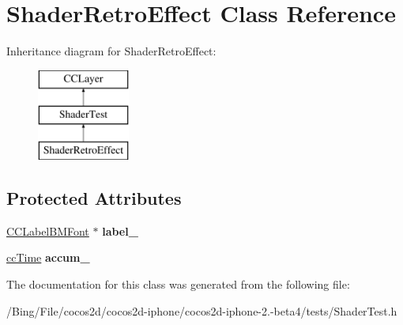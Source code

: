 \hypertarget{interface_shader_retro_effect}{\section{Shader\-Retro\-Effect Class Reference}
\label{interface_shader_retro_effect}
}
Inheritance diagram for Shader\-Retro\-Effect\-:\begin{figure}[H]
\begin{center}
\leavevmode
\includegraphics[height=3.000000cm]{interface_shader_retro_effect}
\end{center}
\end{figure}
\subsection*{Protected Attributes}
\begin{DoxyCompactItemize}
\item 
\hypertarget{interface_shader_retro_effect_ab63a853cc90b80a02f6abe6f64b9cf45}{\hyperlink{interface_c_c_label_b_m_font}{C\-C\-Label\-B\-M\-Font} $\ast$ {\bfseries label\-\_\-}}\label{interface_shader_retro_effect_ab63a853cc90b80a02f6abe6f64b9cf45}

\item 
\hypertarget{interface_shader_retro_effect_a6e23c67c688bb849b01536183e5b4ac7}{\hyperlink{cc_types_8h_ae6c674aac4bfb46a4e6cb1e89bb66b4f}{cc\-Time} {\bfseries accum\-\_\-}}\label{interface_shader_retro_effect_a6e23c67c688bb849b01536183e5b4ac7}

\end{DoxyCompactItemize}


The documentation for this class was generated from the following file\-:\begin{DoxyCompactItemize}
\item 
/\-Bing/\-File/cocos2d/cocos2d-\/iphone/cocos2d-\/iphone-\/2.-\/beta4/tests/Shader\-Test.\-h\end{DoxyCompactItemize}
